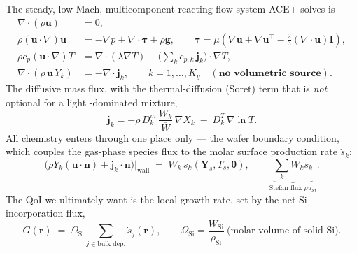 \documentclass[11pt]{article}
\newcommand{\nv}{\mathbf{n}}
\newcommand{\uv}{\mathbf{u}}
\newcommand{\jv}{\mathbf{j}}
\begin{document}
The steady, low-Mach, multicomponent reacting-flow system ACE+ solves is
\begin{align}
\nabla\!\cdot(\rho\uv) &= 0, \label{eq:cont}\\
\rho(\uv\!\cdot\!\nabla)\uv &= -\nabla p + \nabla\!\cdot\boldsymbol{\tau} + \rho\mathbf{g}, \qquad
\boldsymbol{\tau}=\mu\!\left(\nabla\uv+\nabla\uv^{\!\top}-\tfrac{2}{3}(\nabla\!\cdot\uv)\mathbf{I}\right), \label{eq:mom}\\
\rho c_p (\uv\!\cdot\!\nabla)T &= \nabla\!\cdot(\lambda\nabla T) - \Big(\textstyle\sum_k c_{p,k}\,\jv_k\Big)\!\cdot\!\nabla T, \label{eq:energy}\\
\nabla\!\cdot(\rho\,\uv\,Y_k) &= -\nabla\!\cdot\jv_k, \qquad k=1,\dots,K_g \quad(\textbf{no volumetric source}). \label{eq:species}
\end{align}
The diffusive mass flux, with the thermal-diffusion (Soret) term that is \emph{not} optional for a light -dominated mixture,
\begin{equation}
\jv_k = -\rho\, D_k^{m}\,\frac{W_k}{\overline{W}}\,\nabla X_k \;-\; D_k^{T}\,\nabla\ln T .
\label{eq:flux}
\end{equation}
All chemistry enters through one place only --- the wafer boundary condition, which couples the gas-phase species flux to the molar surface production rate $\dot s_k$:
\begin{equation}
\big(\rho Y_k(\uv\!\cdot\!\nv) + \jv_k\!\cdot\!\nv\big)\big|_{\text{wall}} \;=\; W_k\,\dot s_k(\mathbf{Y}_s,T_s,\boldsymbol{\theta}),
\qquad
\underbrace{\sum_k W_k\dot s_k}_{\text{Stefan flux }\rho u_{\!St}} . \label{eq:wallbc}
\end{equation}
The QoI we ultimately want is the local growth rate, set by the net Si incorporation flux,
\begin{equation}
G(\mathbf{r}) \;=\; \Omega_{\mathrm{Si}}\!\!\sum_{j\in\text{bulk dep.}}\!\!\dot s_j(\mathbf{r}),\qquad
\Omega_{\mathrm{Si}}=\frac{W_{\mathrm{Si}}}{\rho_{\mathrm{Si}}}\ \text{(molar volume of solid Si)} . \label{eq:growth}
\end{equation}
\end{document}
